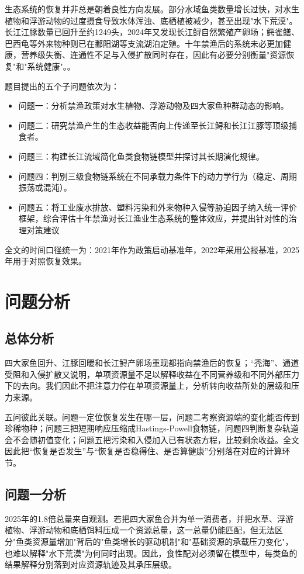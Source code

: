 \documentclass{MMCStyle}
\begin{document}
生态系统的恢复并非总是朝着良性方向发展。部分水域鱼类数量增长过快，对水生植物和浮游动物的过度摄食导致水体浑浊、底栖植被减少，甚至出现"水下荒漠"。长江江豚数量已回升至约1249头，2024年又发现长江鲟自然繁殖产卵场；鳄雀鳝、巴西龟等外来物种则已在鄱阳湖等支流湖泊定殖。十年禁渔后的系统未必更加健康，营养级失衡、连通性不足与入侵扩散同时存在，因此有必要分别衡量"资源恢复"和"系统健康"。\cite{report2022,report2023}。

题目提出的五个子问题依次为：
\begin{itemize}
\item 问题一：分析禁渔政策对水生植物、浮游动物及四大家鱼种群动态的影响。
\item 问题二：研究禁渔产生的生态收益能否向上传递至长江鲟和长江江豚等顶级捕食者。
\item 问题三：构建长江流域简化鱼类食物链模型并探讨其长期演化规律。
\item 问题四：判别三级食物链系统在不同承载力条件下的动力学行为（稳定、周期振荡或混沌）。
\item 问题五：将工业废水排放、塑料污染和外来物种入侵等胁迫因子纳入统一评价框架，综合评估十年禁渔对长江渔业生态系统的整体效应，并提出针对性的治理对策建议
\end{itemize}
全文的时间口径统一为：2021年作为政策启动基准年，2022年采用公报基准，2025年用于对照恢复效果\cite{yangtzeA}。

\section{问题分析}
\subsection{总体分析}
四大家鱼回升、江豚回暖和长江鲟产卵场重现都指向禁渔后的恢复；“秃海”、通道受阻和入侵扩散又说明，单项资源量不足以解释收益在不同营养级和不同外部压力下的去向。我们因此不把注意力停在单项资源量上，分析转向收益所处的层级和压力来源。

五问彼此关联。问题一定位恢复发生在哪一层，问题二考察资源端的变化能否传到珍稀物种；问题三把短期响应压缩成Hastings-Powell食物链，问题四判断复杂轨道会不会随初值变化；问题五把污染和入侵加入已有状态方程，比较剩余收益。全文因此把“恢复是否发生”与“恢复是否稳得住、是否算健康”分别落在对应的计算环节。

\subsection{问题一分析}
2025年的1.8倍总量来自观测。若把四大家鱼合并为单一消费者，并把水草、浮游植物、浮游动物和底栖饵料压成一个资源总量，这一总量仍能匹配，但无法区分"鱼类资源量增加"背后的"鱼类增长的驱动机制"和"基础资源的承载压力变化"，也难以解释"水下荒漠"为何同时出现。因此，食性配对必须留在模型中，每类鱼的结果解释分别落到对应资源轨迹及其承压层级。
\end{document}
